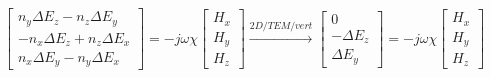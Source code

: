 \documentclass{article}
\newcommand{\dE}{\Delta E}
\newcommand{\0}{\varnothing}
\begin{document}
\begin{align*}
	\left[
    \begin{array}{c}
	n_y \dE_z - n_z \dE_y\\ 
	-n_x \dE_z + n_z \dE_x\\
	n_x \dE_y - n_y \dE_x
	\end{array} \right] = 
	-j \omega \chi 
	\left[
    \begin{array}{c}
     H_x\\
     H_y\\
	 H_z
	 \end{array} \right]
	 \xrightarrow{2D/TEM/vert}
	\left[
    \begin{array}{c}
	0\\ 
	-\dE_z\\
	\dE_y
	\end{array} \right] = 
	-j \omega \chi 
	\left[
    \begin{array}{c}
     H_x\\
     H_y\\
	 H_z
	 \end{array} \right]
\end{align*}
\end{document}
